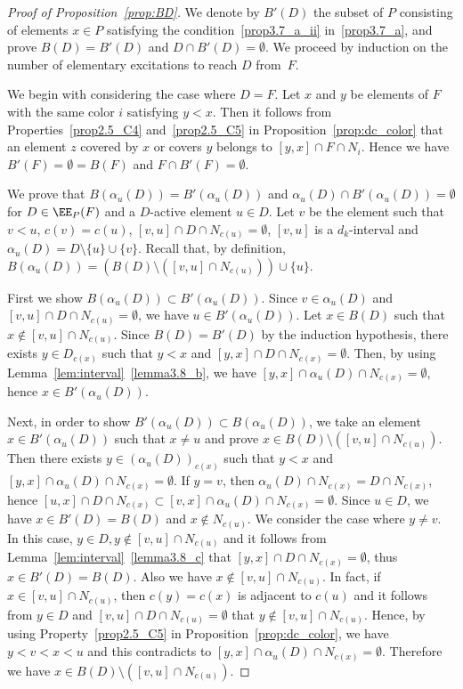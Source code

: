 \begin{proof}[Proof of Proposition~\ref{prop:BD}]
We denote by $B'(D)$ the subset of $P$ consisting of elements $x \in P$ satisfying the condition~\ref{prop3.7_a_ii} in~\ref{prop3.7_a},
and prove $B(D) = B'(D)$ and $D \cap B'(D) = \emptyset$.
We proceed by induction on the number of elementary excitations to reach $D$ from~$F$.

We begin with considering the case where $D = F$.
Let $x$ and $y$ be elements of $F$ with the same color $i$ satisfying $y<x$.
Then it follows from Properties~\ref{prop2.5_C4} and~\ref{prop2.5_C5} in Proposition~\ref{prop:dc_color} that 
an element $z$ covered by $x$ or covers $y$ belongs to $[y,x] \cap F \cap N_i$.
Hence we have $B'(F) = \emptyset = B(F)$ and $F \cap B'(F) = \emptyset$.

We prove that $B(\alpha_u(D)) = B'(\alpha_u(D))$ and $\alpha_u(D) \cap B'(\alpha_u(D)) = \emptyset$ 
for $D \in \EE_P(F)$ and a $D$-active element $u \in D$.
Let $v$ be the element such that $v<u$,
$c(v)=c(u)$, $[v,u] \cap D \cap N_{c(u)} = \emptyset$,
$[v,u]$ is a $d_k$-interval
and $\alpha_u(D) = D \setminus \{ u \} \cup \{ v \}$.
Recall that, by definition, 
$B(\alpha_u(D)) = \left( B(D) \setminus ([v,u] \cap N_{c(u)}) \right) \cup \{ u \}$.

First we show $B(\alpha_u(D)) \subset B'(\alpha_u(D))$.
Since $v \in \alpha_u(D)$ and $[v,u] \cap D \cap N_{c(u)} = \emptyset$, 
we have $u \in B'(\alpha_u(D))$.
Let $x \in B(D)$ such that $x \not\in [v,u] \cap N_{c(u)}$.
Since $B(D) = B'(D)$ by the induction hypothesis, 
there exists $y \in D_{c(x)}$ such that $y<x$ and $[y,x] \cap D \cap N_{c(x)} = \emptyset$.
Then, by using Lemma~\ref{lem:interval}~\ref{lemma3.8_b}, 
we have $[y,x] \cap \alpha_u(D) \cap N_{c(x)} = \emptyset$, hence $x \in B'(\alpha_u(D))$.

Next, in order to show $B'(\alpha_u(D)) \subset B(\alpha_u(D))$, 
we take an element $x \in B'(\alpha_u(D))$ such that $x \neq u$ 
and prove $x \in B(D) \setminus ([v,u] \cap N_{c(u)})$.
Then there exists $y \in (\alpha_u(D))_{c(x)}$ such that 
$y<x$ and $[y,x] \cap \alpha_u(D) \cap N_{c(x)} = \emptyset$.
If $y = v$, then $\alpha_u(D)\cap N_{c(x)}=D\cap N_{c(x)}$, 
hence $[u,x] \cap D \cap N_{c(x)} \subset [v,x] \cap \alpha_u(D) \cap N_{c(x)} = \emptyset$.
Since $u \in D$, we have $x \in B'(D)=B(D)$ and $x \not\in N_{c(u)}$.
We consider the case where $y \neq v$.
In this case, $y \in D, y\not\in [v,u]\cap N_{c(u)}$ 
and it follows from Lemma~\ref{lem:interval}~\ref{lemma3.8_c} 
that $[y,x] \cap D \cap N_{c(x)} = \emptyset$,
thus $x\in B'(D)=B(D)$.
Also we have $x \not\in [v,u] \cap N_{c(u)}$.
In fact, if $x \in [v,u] \cap N_{c(u)}$, 
then $c(y) = c(x)$ is adjacent to $c(u)$ 
and it follows from $y \in D$ and $[v,u] \cap D \cap N_{c(u)} = \emptyset$ that $y \not\in [v,u]\cap N_{c(u)}$.
Hence, by using Property~\ref{prop2.5_C5} in Proposition~\ref{prop:dc_color}, 
we have $y < v < x < u$ and 
this contradicts to $[y,x] \cap \alpha_u(D) \cap N_{c(x)} = \emptyset$.
Therefore we have $x \in B(D) \setminus ([v,u] \cap N_{c(u)})$.


\end{proof}
